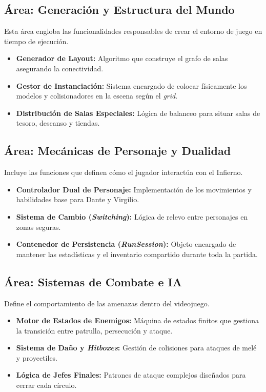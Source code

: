\subsection{Área: Generación y Estructura del Mundo}
Esta área engloba las funcionalidades responsables de crear el entorno de juego en tiempo de ejecución.
\begin{itemize}
    \item \textbf{Generador de Layout:} Algoritmo que construye el grafo de salas asegurando la conectividad.
    \item \textbf{Gestor de Instanciación:} Sistema encargado de colocar físicamente los modelos y colisionadores en la escena según el \textit{grid}.
    \item \textbf{Distribución de Salas Especiales:} Lógica de balanceo para situar salas de tesoro, descanso y tiendas.
\end{itemize}

\subsection{Área: Mecánicas de Personaje y Dualidad}
Incluye las funciones que definen cómo el jugador interactúa con el Infierno.
\begin{itemize}
    \item \textbf{Controlador Dual de Personaje:} Implementación de los movimientos y habilidades base para Dante y Virgilio.
    \item \textbf{Sistema de Cambio (\textit{Switching}):} Lógica de relevo entre personajes en zonas seguras.
    \item \textbf{Contenedor de Persistencia (\textit{RunSession}):} Objeto encargado de mantener las estadísticas y el inventario compartido durante toda la partida.
\end{itemize}

\subsection{Área: Sistemas de Combate e IA}
Define el comportamiento de las amenazas dentro del videojuego.
\begin{itemize}
    \item \textbf{Motor de Estados de Enemigos:} Máquina de estados finitos que gestiona la transición entre patrulla, persecución y ataque.
    \item \textbf{Sistema de Daño y \textit{Hitboxes}:} Gestión de colisiones para ataques de melé y proyectiles.
    \item \textbf{Lógica de Jefes Finales:} Patrones de ataque complejos diseñados para cerrar cada círculo.
\end{itemize}

